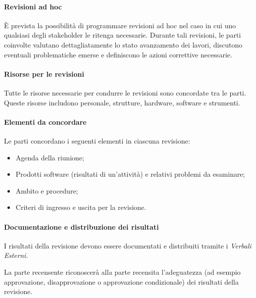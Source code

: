 \paragraph{Revisioni ad hoc}
È prevista la possibilità di programmare revisioni ad hoc nel caso in cui uno qualsiasi degli stakeholder le ritenga necessarie.
Durante tali revisioni, le parti coinvolte valutano dettagliatamente lo stato avanzamento dei lavori, discutono eventuali problematiche emerse e definiscono le azioni correttive necessarie.

\paragraph{Risorse per le revisioni}
Tutte le risorse necessarie per condurre le revisioni sono concordate tra le parti. Queste risorse includono personale, strutture, hardware, software e strumenti.

\paragraph{Elementi da concordare}
Le parti concordano i seguenti elementi in ciascuna revisione:
\begin{itemize}
    \item Agenda della riunione;
    \item Prodotti software (risultati di un'attività) e relativi problemi da esaminare;
    \item Ambito e procedure;
    \item Criteri di ingresso e uscita per la revisione.
\end{itemize}


\paragraph{Documentazione e distribuzione dei risultati}
I risultati della revisione devono essere documentati e distribuiti tramite i \textit{Verbali Esterni}.

La parte recensente riconoscerà alla parte recensita l'adeguatezza (ad esempio approvazione, disapprovazione o approvazione condizionale) dei risultati della revisione.

